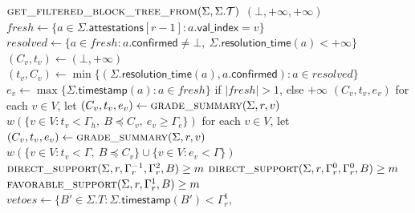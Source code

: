 \documentclass{article}
\theoremstyle{plain}
\theoremstyle{definition}
\theoremstyle{remark}
\newcommand{\valindex}{\mathsf{val\_index}}
\newcommand{\confirmedf}{\mathsf{confirmed}}
\newcommand{\T}{\mathcal T}
\newcommand{\attestations}{\mathsf{attestations}}
\newcommand{\timestamp}{\mathsf{timestamp}}
\newcommand{\resolutionTime}{\mathsf{resolution\_time}}
\begin{document}
{\begin{algorithmic}[1]
  \State \Return
    $\Call{get\_filtered\_block\_tree\_from}{\Sigma,\Sigma.\T}$
\EndFunction
\vspace{1pt}
   \State \Return $(\bot,+\infty,+\infty)$ \EndIf
  \State $\mathit{fresh}\gets
    \{a\in\Sigma.\attestations[r-1]:
    a.\valindex=v\}$
  \State $\mathit{resolved}\gets\{a\in\mathit{fresh}:
    a.\confirmedf\neq\bot,\ \Sigma.\resolutionTime(a)<+\infty\}$
    \State $(C_v,t_v)\gets(\bot,+\infty)$
  \Else
    \State $(t_v,C_v)\gets
      \min\{(\Sigma.\resolutionTime(a),a.\confirmedf):
      a\in\mathit{resolved}\}$
  \EndIf
  \State $e_v\gets\max\{\Sigma.\timestamp(a):
    a\in\mathit{fresh}\}$ if
  \Statex \hspace{2em}$|\mathit{fresh}|>1$,
    else $+\infty$
  \State \Return $(C_v,t_v,e_v)$
\EndFunction
\vspace{1pt}
  \State for each $v\in V$, let
    $(C_v,t_v,e_v)\gets\Call{grade\_summary}{\Sigma,r,v}$
  \State \Return $w(\{v\in V:t_v<\Gamma_h,\ B\preceq C_v,\
    e_v\geq\Gamma_e\})$
\EndFunction
\vspace{1pt}
  \State for each $v\in V$, let
    $(C_v,t_v,e_v)\gets\Call{grade\_summary}{\Sigma,r,v}$
  \State \Return $w(\{v\in V:t_v<\Gamma,\ B\preceq C_v\}
    \cup\{v\in V:e_v<\Gamma\})$
\EndFunction
\vspace{1pt}
  \State \Return $\Call{direct\_support}{\Sigma,r,\Gamma_r^{-1},
    \Gamma_r^2,B}\geq m$
\EndFunction
\vspace{1pt}
  \State \Return $\Call{direct\_support}{\Sigma,r,\Gamma_r^0,
    \Gamma_r^0,B}\geq m$
\EndFunction
\vspace{1pt}
  \State \Return $\Call{favorable\_support}{\Sigma,r,\Gamma_r^1,B}
    \geq m$
\EndFunction
\vspace{1pt}
  \State $\mathit{vetoes}\gets
    \{B'\in\Sigma.T:
    \Sigma.\timestamp(B')<\Gamma_r^1,$

\end{algorithmic}}
\end{document}
